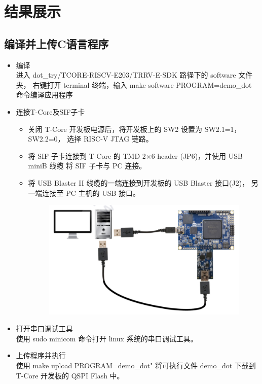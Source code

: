 \documentclass[a4paper, 14pt, oneside]{book} %
\numberwithin{equation}{subsection}
\begin{document}
	\section{结果展示}	
	\subsection{编译并上传C语言程序}
		\begin{itemize}
			\item{编译}\\
				进入 dot\_try/TCORE-RISCV-E203/TRRV-E-SDK 路径下的 software 文件夹，
				右键打开 terminal 终端，输入 make software PROGRAM=demo\_dot 命令编译应用程序
			\item{连接T-Core及SIF子卡}
				\begin{itemize}
					\item
						关闭 T-Core 开发板电源后，将开发板上的 SW2 设置为 SW2.1=1，SW2.2=0，
						选择 RISC-V JTAG 链路。
					\item
						将 SIF 子卡连接到 T-Core 的 TMD 2×6 header (JP6)，并使用 USB miniB 线缆
						将 SIF 子卡与 PC 连接。
					\item
						将 USB Blaster II 线缆的一端连接到开发板的 USB Blaster 接口(J2)，
						另一端连接至 PC 主机的 USB 接口。
						\begin{figure}[H]
							\centering
							\includegraphics[scale=0.4]{img/connect.png}
						\end{figure}
				\end{itemize}	
			\item{打开串口调试工具}\\
				使用 sudo minicom 命令打开 linux 系统的串口调试工具。
			\item{上传程序并执行}\\
				使用 make upload PROGRAM=demo\_dot" 将可执行文件 demo\_dot 下载到 T-Core 开发板的 QSPI Flash 中。
		\end{itemize}
\end{document}
